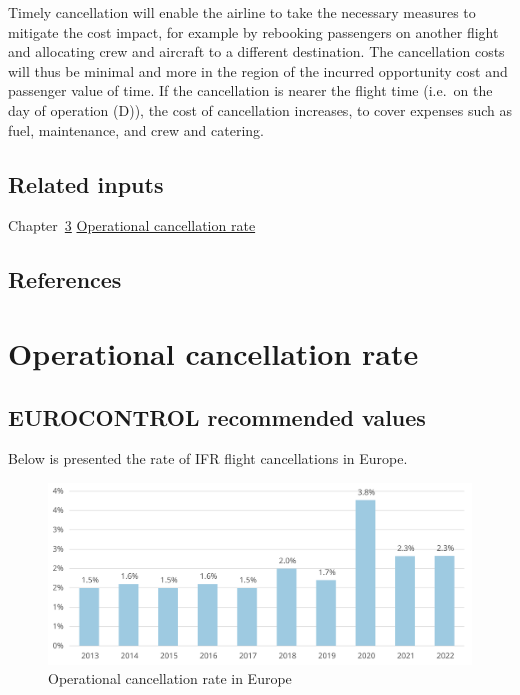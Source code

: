 \documentclass[
  11pt,
  a4paper,
]{book}
\begin{document}
Timely cancellation will enable the airline to take the necessary
measures to mitigate the cost impact, for example by rebooking
passengers on another flight and allocating crew and aircraft to a
different destination. The cancellation costs will thus be minimal and
more in the region of the incurred opportunity cost and passenger value
of time. If the cancellation is nearer the flight time (i.e.~on the day
of operation (D)), the cost of cancellation increases, to cover expenses
such as fuel, maintenance, and crew and catering.

\hypertarget{related-inputs-11}{%
\section{Related inputs}\label{related-inputs-11}}

Chapter~\ref{sec-operational-cancellation-rate}
\protect\hyperlink{sec-operational-cancellation-rate}{Operational
cancellation rate}

\hypertarget{references-14}{%
\section{References}\label{references-14}}

\hypertarget{sec-operational-cancellation-rate}{%
\chapter{Operational cancellation
rate}\label{sec-operational-cancellation-rate}}

\hypertarget{eurocontrol-recommended-values-12}{%
\section{EUROCONTROL recommended
values}\label{eurocontrol-recommended-values-12}}

Below is presented the rate of IFR flight cancellations in Europe.

\begin{figure}

{\centering \includegraphics{chapters/../figures/cancellation_rate.svg}

}

\caption{\label{fig-cancellation-rate}Operational cancellation rate in
Europe}

\end{figure}
\end{document}
